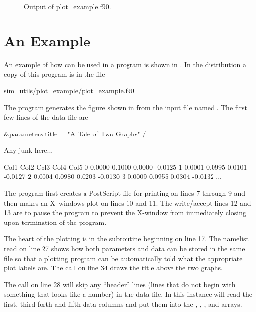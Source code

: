 \begin{figure}
\caption{Output of plot_example.f90.}
\label{f:plot.out}
\end{figure}

\section{An Example}
\label{s:plot.example}

An example of how \quickplot can be used in a program is shown in
. In the \bmad distribution a copy of this
program is in the file
\begin{example}
  sim_utils/plot_example/plot_example.f90
\end{example}
The  program generates the figure shown in
 from the input file named . The
first few lines of the data file are
\begin{example}
  \&parameters
    title = "A Tale of Two Graphs"
  /
 
  Any junk here...
 
  Col1      Col2      Col3      Col4      Col5
     0    0.0000    0.1000    0.0000   -0.0125
     1    0.0001    0.0995    0.0101   -0.0127
     2    0.0004    0.0980    0.0203   -0.0130
     3    0.0009    0.0955    0.0304   -0.0132
     ...
\end{example}

The program first creates a PostScript file for printing on lines 7
through 9 and then makes an X--windows plot on lines 10 and 11. The
write/accept lines 12 and 13 are to pause the program to prevent the
X-window from immediately closing upon termination of the program.

The heart of the plotting is in the subroutine  beginning
on line 17. The namelist read on line 27 shows how both parameters and
data can be stored in the same file so that a plotting program can be
automatically told what the appropriate plot labels are. The
 call on line 34 draws the 
title above the two graphs.

The  call on line 28 will skip
any ``header'' lines (lines that do not begin with something that looks
like a number) in the data file. In this instance
 will read the first, third forth
and fifth data columns and put them into the , , , and
 arrays.

